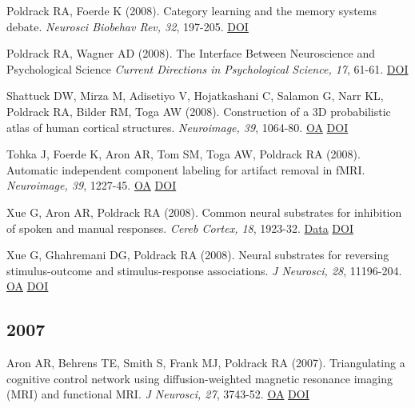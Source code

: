\documentclass[10pt, letterpaper]{article}
\begin{document}
Poldrack RA, Foerde K (2008). Category learning and the memory systems debate. \textit{Neurosci Biobehav Rev, 32}, 197-205. \href{http://dx.doi.org/10.1016/j.neubiorev.2007.07.007}{DOI} \vspace{2mm}

Poldrack RA, Wagner AD (2008). The Interface Between Neuroscience and Psychological Science \textit{Current Directions in Psychological Science, 17}, 61-61. \href{http://dx.doi.org/10.1111/j.1467-8721.2008.00549.x}{DOI} \vspace{2mm}

Shattuck DW, Mirza M, Adisetiyo V, Hojatkashani C, Salamon G, Narr KL, Poldrack RA, Bilder RM, Toga AW (2008). Construction of a 3D probabilistic atlas of human cortical structures. \textit{Neuroimage, 39}, 1064-80. \href{https://www.ncbi.nlm.nih.gov/pmc/articles/PMC2757616}{OA} \href{http://dx.doi.org/10.1016/j.neuroimage.2007.09.031}{DOI} \vspace{2mm}

Tohka J, Foerde K, Aron AR, Tom SM, Toga AW, Poldrack RA (2008). Automatic independent component labeling for artifact removal in fMRI. \textit{Neuroimage, 39}, 1227-45. \href{https://www.ncbi.nlm.nih.gov/pmc/articles/PMC2374836}{OA} \href{http://dx.doi.org/10.1016/j.neuroimage.2007.10.013}{DOI} \vspace{2mm}

Xue G, Aron AR, Poldrack RA (2008). Common neural substrates for inhibition of spoken and manual responses. \textit{Cereb Cortex, 18}, 1923-32. \href{https://openneuro.org/datasets/ds000007/versions/00001}{Data} \href{http://dx.doi.org/10.1093/cercor/bhm220}{DOI} \vspace{2mm}

Xue G, Ghahremani DG, Poldrack RA (2008). Neural substrates for reversing stimulus-outcome and stimulus-response associations. \textit{J Neurosci, 28}, 11196-204. \href{https://www.ncbi.nlm.nih.gov/pmc/articles/PMC6671509}{OA} \href{http://dx.doi.org/10.1523/jneurosci.4001-08.2008}{DOI} \vspace{2mm}

\subsection*{2007}Aron AR, Behrens TE, Smith S, Frank MJ, Poldrack RA (2007). Triangulating a cognitive control network using diffusion-weighted magnetic resonance imaging (MRI) and functional MRI. \textit{J Neurosci, 27}, 3743-52. \href{https://www.ncbi.nlm.nih.gov/pmc/articles/PMC6672420}{OA} \href{http://dx.doi.org/10.1523/jneurosci.0519-07.2007}{DOI} \vspace{2mm}
\end{document}
